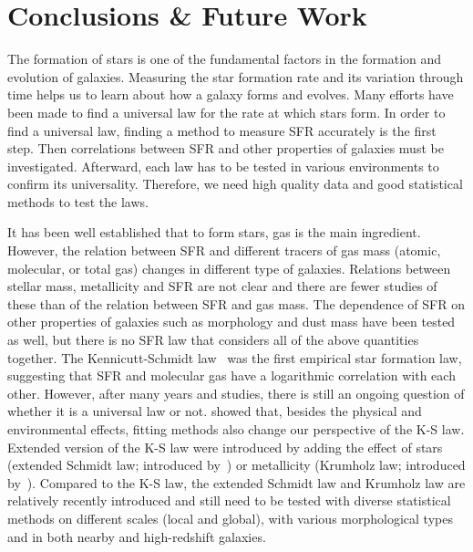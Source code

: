 \chapter{Conclusions \& Future Work}
\label{ch: summary}
The formation of stars is one of the fundamental factors in the formation and evolution of galaxies.
Measuring the star formation rate and its variation through time helps us to learn about how a galaxy forms and evolves.
Many efforts have been made to find a universal law for the rate at which stars form.
In order to find a universal law, finding a method to measure SFR accurately is the first step.
Then correlations between SFR and other properties of galaxies must be investigated.
Afterward, each law has to be tested in various environments to confirm its universality.
Therefore, we need high quality data and good statistical methods to test the laws.

It has been well established that to form stars, gas is the main ingredient.
However, the relation between SFR and different tracers of gas mass (atomic, molecular, or total gas) changes in different type of galaxies.
Relations between stellar mass, metallicity and SFR are not clear and there are fewer studies of these than of the relation between SFR and gas mass.
The dependence of SFR on other properties of galaxies such as morphology and dust mass have been tested as well, but there is no SFR law that considers all of the above quantities together.
The Kennicutt-Schmidt law~\citep{Schmidt59, Kennicutt98b} was the first empirical star formation law, suggesting that SFR and molecular gas have a logarithmic correlation with each other. 
However, after many years and studies, there is still an ongoing question of whether it is a universal law or not.
\citet{Shetty13} showed that, besides the physical and environmental effects, fitting methods also change our perspective of the K-S law.
Extended version of the K-S law were introduced by adding the effect of stars (extended Schmidt law; introduced by~\citealt{Shi11}) or metallicity (Krumholz law; introduced by~\citealt{Krumholz09}).
Compared to the K-S law, the extended Schmidt law and Krumholz law are relatively recently introduced and still need to be tested with diverse statistical methods on different scales (local and global), with various morphological types and in both nearby and high-redshift galaxies.

